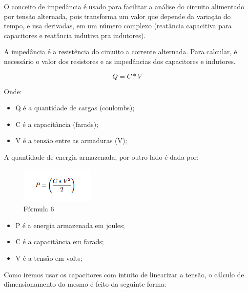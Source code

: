 O conceito de impedância é usado para facilitar a análise do circuito alimentado por tensão alternada, pois transforma um valor que depende da variação do tempo, e usa derivadas, em um número complexo (reatância capacitiva para capacitores e reatância indutiva pra indutores).

A impedância é a resistência do circuito a corrente alternada. Para calcular, é necessário o valor dos resistores e as impedâncias dos capacitores e indutores.

\begin{equation}
    Q = C \ast V
\end{equation}

Onde:

\begin{itemize}
    \item Q é a quantidade de cargas (coulombs);
    \item C é a capacitância (farads);
    \item V é a tensão entre as armaduras (V);
\end{itemize}

A quantidade de energia armazenada, por outro lado é dada por:

\begin{figure}[!h]
	\centering
		\includegraphics[scale=0.9]{figuras/energia/14.png}
	\caption{Fórmula 6}
\end{figure}

\begin{itemize}
    \item P é a energia armazenada em joules;
    \item C é a capacitância em farads;
    \item V é a tensão em volts;
\end{itemize}

Como iremos usar os capacitores com intuito de linearizar a tensão, o cálculo de dimensionamento do mesmo é feito da seguinte forma:


